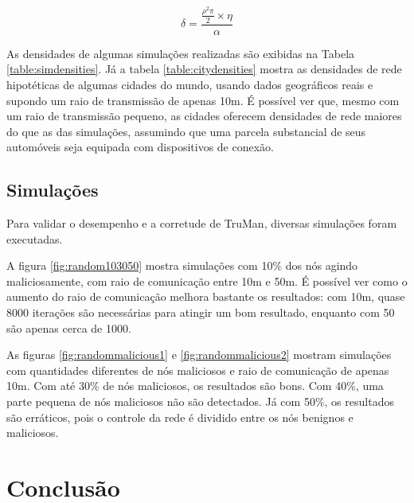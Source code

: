 \begin{resumoextendido}
	$$ \delta = \frac{\frac{\rho^2\pi}{2} \times \eta}{\alpha} $$
	
	As densidades de algumas simulações realizadas são exibidas na Tabela \ref{table:simdensities}.
	Já a tabela \ref{table:citydensities} mostra as densidades de rede hipotéticas de algumas cidades do mundo, usando dados geográficos reais e supondo um raio de transmissão de apenas 10m.
	É possível ver que, mesmo com um raio de transmissão pequeno, as cidades oferecem densidades de rede maiores do que as das simulações, assumindo que uma parcela substancial de seus automóveis seja equipada com dispositivos de conexão.
	
	\subsection*{Simulações}
	
	Para validar o desempenho e a corretude de TruMan, diversas simulações foram executadas.
	
	A figura \ref{fig:random103050} mostra simulações com 10\% dos nós agindo maliciosamente, com raio de comunicação entre 10m e 50m.
	É possível ver como o aumento do raio de comunicação melhora bastante os resultados:
	com 10m, quase 8000 iterações são necessárias para atingir um bom resultado, enquanto com 50 são apenas cerca de 1000.
	
	As figuras \ref{fig:randommalicious1} e \ref{fig:randommalicious2} mostram simulações com quantidades diferentes de nós maliciosos e raio de comunicação de apenas 10m.
	Com até 30\% de nós maliciosos, os resultados são bons.
	Com 40\%, uma parte pequena de nós maliciosos não são detectados.
	Já com 50\%, os resultados são erráticos, pois o controle da rede é dividido entre os nós benignos e maliciosos.
	
	\section*{Conclusão}
\end{resumoextendido}